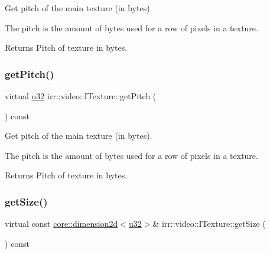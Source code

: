 Get pitch of the main texture (in bytes). 

The pitch is the amount of bytes used for a row of pixels in a texture. \begin{DoxyReturn}{Returns}
Pitch of texture in bytes. 
\end{DoxyReturn}
\mbox{\label{classirr_1_1video_1_1ITexture_a14fd1eba217a0dd86b40c4d792ab14ea}} 
\subsubsection{\texorpdfstring{get\+Pitch()}{getPitch()}\hspace{0.1cm}{\footnotesize\ttfamily [2/2]}}
{\footnotesize\ttfamily virtual \hyperlink{namespaceirr_a0416a53257075833e7002efd0a18e804}{u32} irr\+::video\+::\+I\+Texture\+::get\+Pitch (\begin{DoxyParamCaption}{ }\end{DoxyParamCaption}) const\hspace{0.3cm}{\ttfamily [pure virtual]}}



Get pitch of the main texture (in bytes). 

The pitch is the amount of bytes used for a row of pixels in a texture. \begin{DoxyReturn}{Returns}
Pitch of texture in bytes. 
\end{DoxyReturn}
\mbox{\label{classirr_1_1video_1_1ITexture_adfcf9558c0f1ae543782c03f7903c48e}} 
\subsubsection{\texorpdfstring{get\+Size()}{getSize()}\hspace{0.1cm}{\footnotesize\ttfamily [1/2]}}
{\footnotesize\ttfamily virtual const \hyperlink{classirr_1_1core_1_1dimension2d}{core\+::dimension2d}$<$\hyperlink{namespaceirr_a0416a53257075833e7002efd0a18e804}{u32}$>$\& irr\+::video\+::\+I\+Texture\+::get\+Size (\begin{DoxyParamCaption}{ }\end{DoxyParamCaption}) const\hspace{0.3cm}{\ttfamily [pure virtual]}}



